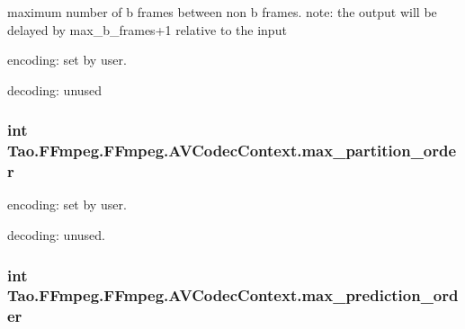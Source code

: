 \label{struct_tao_1_1_f_fmpeg_1_1_f_fmpeg_1_1_a_v_codec_context_a4a4ab0f9d4445b172e83883d1802b0fd}
maximum number of b frames between non b frames. note: the output will be delayed by max\_\-b\_\-frames+1 relative to the input
\begin{DoxyItemize}
\item encoding: set by user.
\item decoding: unused 
\end{DoxyItemize}\hypertarget{struct_tao_1_1_f_fmpeg_1_1_f_fmpeg_1_1_a_v_codec_context_a3ae9ad7a8994e190701ffe68f876d616}{
\subsubsection[{max\_\-partition\_\-order}]{\setlength{\rightskip}{0pt plus 5cm}int {\bf Tao.FFmpeg.FFmpeg.AVCodecContext.max\_\-partition\_\-order}}}
\label{struct_tao_1_1_f_fmpeg_1_1_f_fmpeg_1_1_a_v_codec_context_a3ae9ad7a8994e190701ffe68f876d616}

\begin{DoxyItemize}
\item encoding: set by user.
\item decoding: unused. 
\end{DoxyItemize}\hypertarget{struct_tao_1_1_f_fmpeg_1_1_f_fmpeg_1_1_a_v_codec_context_a8aefc7869e8ca3350d64b0e212b1933e}{
\subsubsection[{max\_\-prediction\_\-order}]{\setlength{\rightskip}{0pt plus 5cm}int {\bf Tao.FFmpeg.FFmpeg.AVCodecContext.max\_\-prediction\_\-order}}}
\label{struct_tao_1_1_f_fmpeg_1_1_f_fmpeg_1_1_a_v_codec_context_a8aefc7869e8ca3350d64b0e212b1933e}

